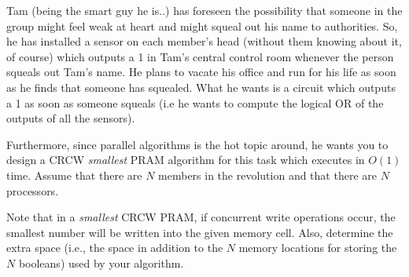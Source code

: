 Tam (being the smart guy he is..) has foreseen the possibility that
someone in the group might feel weak at heart and might squeal out his
name to authorities. So, he has installed a sensor on each member's
head (without them knowing about it, of course) which outputs a 1 in
Tam's central control room whenever the person squeals out Tam's
name. He plans to vacate his office and run for his life as soon as he
finds that someone has squealed. What he wants is a circuit which
outputs a 1 as soon as someone squeals (i.e he wants to compute the
logical OR of the outputs of all the sensors).

Furthermore, since parallel algorithms is the hot topic around, he
wants you to design a CRCW {\em smallest} PRAM algorithm for this task
which executes in $O(1)$ time. Assume that there are $N$ members in
the revolution and that there are $N$ processors.

Note that in a {\em smallest} CRCW PRAM, if concurrent write
operations occur, the smallest number will be written into the given
memory cell.  Also, determine the extra space (i.e., the space in
addition to the $N$ memory locations for storing the $N$ booleans)
used by your algorithm.
